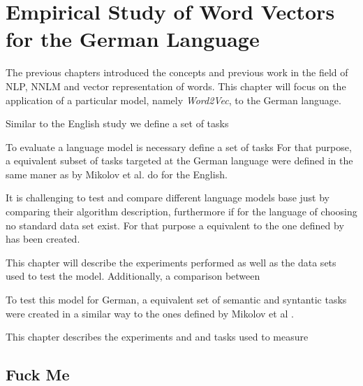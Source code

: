 \chapter{Empirical Study of Word Vectors for the German Language}
\label{chapter:wor2vec_german}










The previous chapters introduced the concepts and previous work in the field
of  \ac{NLP}, \ac{NNLM} and vector representation of words. This chapter will
focus on the application of a particular model, namely \textit{Word2Vec}, to
the German language.  

Similar to the English study we define a set of tasks 


To evaluate a language model is necessary define a set of tasks 
For that purpose, a equivalent subset of tasks targeted at the German language were
defined in the same maner as by Mikolov et al.
\cite{DBLP:journals/corr/abs-1301-3781} do for the English.  


It is challenging to test and compare different language models base just by
comparing their algorithm description, furthermore if for the language of
choosing no standard data set exist. For that purpose a equivalent  to the
one defined by  has been created. 

This chapter will describe the experiments performed as well as the data sets
used to test the model. Additionally, a comparison between

To test this model for  German,  a equivalent set of semantic and
syntantic tasks were created in a similar way to the ones defined by Mikolov
et al \cite{MikolovSCCD13}.

This chapter describes the experiments and and tasks used to measure  



\section{Fuck Me}



